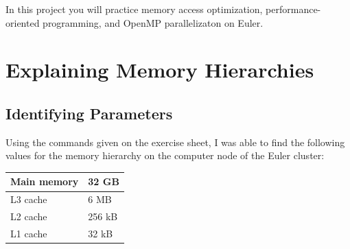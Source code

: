 \documentclass[unicode,11pt,a4paper,oneside,numbers=endperiod,openany]{scrartcl}
\begin{document}
\setassignment
{}

\newline

\assignmentpolicy
In this project you will practice memory access optimization, performance-oriented programming, and OpenMP parallelizaton 
on Euler.

\section{Explaining Memory Hierarchies }

\subsection{Identifying Parameters}
Using the commands given on the exercise sheet, I was able to find the following values for the memory hierarchy on the computer node of the Euler cluster:
\begin{center}
    \begin{tabular}{ |l|l| }
    \hline
    Main memory & 32 GB \\ \hline
    L3 cache & 6 MB \\ \hline
    L2 cache & 256 kB \\ \hline
    L1 cache & 32 kB \\
    \hline
    \end{tabular}
\end{center}
\end{document}
